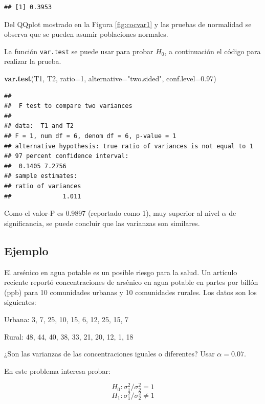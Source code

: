 \documentclass[10pt,]{krantz}
\makeatletter
\newenvironment{Shaded}{\begin{snugshade}}{\end{snugshade}}
\newcommand{\KeywordTok}[1]{\textcolor[rgb]{0.13,0.29,0.53}{\textbf{{#1}}}}
\newcommand{\DataTypeTok}[1]{\textcolor[rgb]{0.13,0.29,0.53}{{#1}}}
\newcommand{\DecValTok}[1]{\textcolor[rgb]{0.00,0.00,0.81}{{#1}}}
\newcommand{\FloatTok}[1]{\textcolor[rgb]{0.00,0.00,0.81}{{#1}}}
\newcommand{\StringTok}[1]{\textcolor[rgb]{0.31,0.60,0.02}{{#1}}}
\newcommand{\NormalTok}[1]{{#1}}
\newenvironment{kframe}{%
\medskip{}
\setlength{\fboxsep}{.8em}
 \def\at@end@of@kframe{}%
 \ifinner\ifhmode%
  \def\at@end@of@kframe{\end{minipage}}%
  \begin{minipage}{\columnwidth}%
 \fi\fi%
 \def\FrameCommand##1{\hskip\@totalleftmargin \hskip-\fboxsep
 \colorbox{shadecolor}{##1}\hskip-\fboxsep
     \hskip-\linewidth \hskip-\@totalleftmargin \hskip\columnwidth}%
 \MakeFramed {\advance\hsize-\width
   \@totalleftmargin\z@ \linewidth\hsize
   \@setminipage}}%
 {\par\unskip\endMakeFramed%
 \at@end@of@kframe}
\renewenvironment{Shaded}{\begin{kframe}}{\end{kframe}}
\makeatother
\begin{document}
\begin{verbatim}
## [1] 0.3953
\end{verbatim}

Del QQplot mostrado en la Figura \ref{fig:cocvar1} y las pruebas de
normalidad se observa que se pueden asumir poblaciones normales.

La función \texttt{var.test} se puede usar para probar \(H_0\), a
continuación el código para realizar la prueba.

\begin{Shaded}
\begin{Highlighting}[]
\KeywordTok{var.test}\NormalTok{(T1, T2, }\DataTypeTok{ratio=}\DecValTok{1}\NormalTok{, }\DataTypeTok{alternative=}\StringTok{"two.sided"}\NormalTok{,}
         \DataTypeTok{conf.level=}\FloatTok{0.97}\NormalTok{)}
\end{Highlighting}
\end{Shaded}

\begin{verbatim}
## 
##  F test to compare two variances
## 
## data:  T1 and T2
## F = 1, num df = 6, denom df = 6, p-value = 1
## alternative hypothesis: true ratio of variances is not equal to 1
## 97 percent confidence interval:
##  0.1405 7.2756
## sample estimates:
## ratio of variances 
##              1.011
\end{verbatim}

Como el valor-P es 0.9897 (reportado como 1), muy superior al nivel
\(\alpha\) de significancia, se puede concluir que las varianzas son
similares.

\subsection*{Ejemplo}\label{ejemplo-66}


El arsénico en agua potable es un posible riesgo para la salud. Un
artículo reciente reportó concentraciones de arsénico en agua potable en
partes por billón (ppb) para 10 comunidades urbanas y 10 comunidades
rurales. Los datos son los siguientes:

Urbana: 3, 7, 25, 10, 15, 6, 12, 25, 15, 7

Rural: 48, 44, 40, 38, 33, 21, 20, 12, 1, 18

¿Son las varianzas de las concentraciones iguales o diferentes? Usar
\(\alpha=0.07\).

En este problema interesa probar:

\[H_0: \sigma_1^2 / \sigma_2^2 = 1\]
\[H_1: \sigma_1^2 / \sigma_2^2 \neq 1\]
\end{document}

